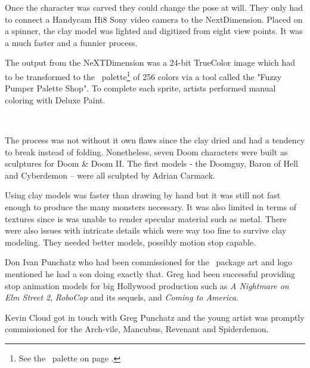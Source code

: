 \vspace{-4mm}
Once the character was carved they could change the pose at will. They only had to connect a Handycam Hi8 Sony video camera to the NextDimension. Placed on a spinner, the clay model was lighted and digitized from eight view points. It was a much faster and a funnier process.\\
\par
The output from the NeXTDimension was a 24-bit TrueColor image which had to be transformed to the \doom~palette\footnote{See the \doom~palette on page \pageref{doom_palette}.} of 256 colors via a tool called the "Fuzzy Pumper Palette Shop". To complete each sprite, artists performed manual coloring with Deluxe Paint.\\
\par
{}\\
\par
The process was not without it own flaws since the clay dried and had a tendency to break instead of folding. Nonetheless, seven Doom characters were built as sculptures for Doom \& Doom II. The first models - the Doomguy, Baron of Hell and Cyberdemon -- were all sculpted by Adrian Carmack.\\
\par
{}

\par
{}




\vspace{-4mm}
Using clay models was faster than drawing by hand but it was still not fast enough to produce the many monsters necessary. It was also limited in terms of textures since is was unable to render specular material such as metal. There were also issues with intricate details which were way too fine to survive clay modeling. They needed better models, possibly motion stop capable.\\
\par
Don Ivan Punchatz who had been commissioned for the \doom~package art and logo mentioned he had a son doing exactly that. Greg had been successful providing stop animation models for big Hollywood production such as \textit{A Nightmare on Elm Street 2}, \textit{RoboCop} and its sequels, and \textit{Coming to America}. \\
\par
Kevin Cloud got in touch with Greg Punchatz and the young artist was promptly commissioned for the Arch-vile, Mancubus, Revenant and Spiderdemon.\\
\par

